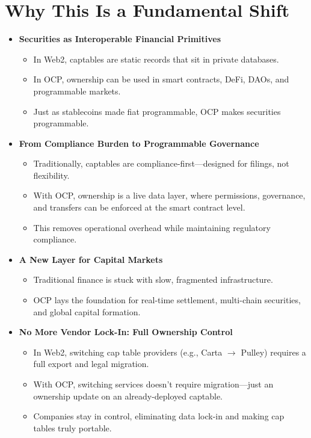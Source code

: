\documentclass[11pt,a4paper]{article}
\begin{document}
\section{Why This Is a Fundamental Shift}
\begin{itemize}
    \item \textbf{Securities as Interoperable Financial Primitives}
    \begin{itemize}
        \item In Web2, captables are static records that sit in private databases.
        \item In OCP, ownership can be used in smart contracts, DeFi, DAOs, and programmable markets.
        \item Just as stablecoins made fiat programmable, OCP makes securities programmable.
    \end{itemize}

    \item \textbf{From Compliance Burden to Programmable Governance}
    \begin{itemize}
        \item Traditionally, captables are compliance-first---designed for filings, not flexibility.
        \item With OCP, ownership is a live data layer, where permissions, governance, and transfers can be enforced at the smart contract level.
        \item This removes operational overhead while maintaining regulatory compliance.
    \end{itemize}

    \item \textbf{A New Layer for Capital Markets}
    \begin{itemize}
        \item Traditional finance is stuck with slow, fragmented infrastructure.
        \item OCP lays the foundation for real-time settlement, multi-chain securities, and global capital formation.
    \end{itemize}

    \item \textbf{No More Vendor Lock-In: Full Ownership Control}
    \begin{itemize}
        \item In Web2, switching cap table providers (e.g., Carta $\rightarrow$ Pulley) requires a full export and legal migration.
        \item With OCP, switching services doesn't require migration---just an ownership update on an already-deployed captable.
        \item Companies stay in control, eliminating data lock-in and making cap tables truly portable.
    \end{itemize}
\end{itemize}
\end{document}
